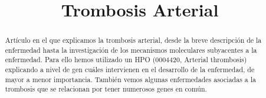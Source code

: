 \documentclass{bmcart}
\begin{document}
	\begin{frontmatter}
	
		\begin{fmbox}
			
			
			\title{Trombosis Arterial}
			
			
			\author[
			  addressref={aff1},                   %
			  corref={aff1},                       %
			  email={pablomolinasanchez01@uma.es}   %
			]{ } %
			\author[
			  addressref={aff1},
			  email={hugoavalos@uma.es}
			]{ }
			
			
			\address[id=aff1]{%
			  ,             %
			  ,          %
			  ,                              %
			}
		
		\end{fmbox}%
		
		\begin{abstractbox}
		
			\begin{abstract} %
			Artículo en el que explicamos la trombosis arterial, desde la breve descripción de la enfermedad hasta la investigación de los mecanismos moleculares subyacentes a la enfermedad. Para ello hemos utilizado un HPO (0004420, Arterial thrombosis) explicando a nivel de gen cuáles intervienen en el desarrollo de la enfermedad, de mayor a menor importancia. También vemos algunas enfermedades asociadas a la trombosis que se relacionan por tener numerosos genes en común.
			

\end{abstract}
\end{abstractbox}
\end{frontmatter}
\end{document}
